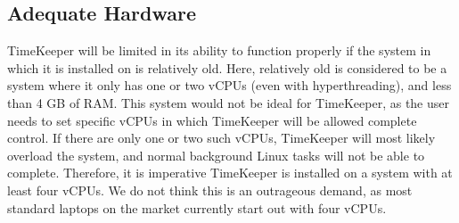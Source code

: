 \subsection{Adequate Hardware}
TimeKeeper will be limited in its ability to function properly if the system in which it is installed on is relatively old. Here, relatively old is considered to be a system where it only has one or two vCPUs (even with hyperthreading), and less than 4 GB of RAM. This system would not be ideal for TimeKeeper, as the user needs to set specific vCPUs in which TimeKeeper will be allowed complete control. If there are only one or two such vCPUs, TimeKeeper will most likely overload the system, and normal background Linux tasks will not be able to complete. Therefore, it is imperative TimeKeeper is installed on a system with at least four vCPUs. We do not think this is an outrageous demand, as most standard laptops on the market currently start out with four vCPUs. 
